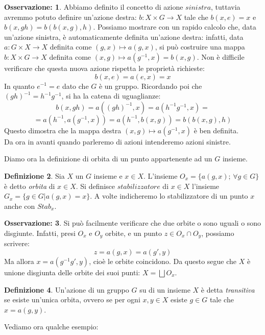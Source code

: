 \documentclass[12pt,a4paper]{report}
\theoremstyle{definition}
\newtheorem{Def}{Definizione}[chapter]
\theoremstyle{Theorem}
\theoremstyle{definition}
\theoremstyle{definition}
\theoremstyle{definition}
\newtheorem{Obs}[Def]{Osservazione:}
\begin{document}
\begin{Obs}
Abbiamo definito il concetto di azione $\textit{sinistra}$, tuttavia avremmo potuto definire un'azione destra: $b:X\times G\rightarrow X$ tale che $b(x,e)=x$ e $b(x,gh)=b(b(x,g),h)$. Possiamo mostrare con un rapido calcolo che, data un'azione sinistra, è automaticamente definita un'azione destra: infatti, data $a:G\times X\rightarrow X$ definita come $(g,x)\longmapsto a(g,x)$, si può costruire una mappa $b:X\times G\rightarrow X$ definita come $(x,g)\longmapsto a(g^{-1},x)=b(x,g)$. Non è difficile verificare che questa nuova azione rispetta le proprietà richieste:
$$b(x,e)=a(e,x)=x$$
In quanto $e^{-1}=e$ dato che $G$ è un gruppo. Ricordando poi che $(gh)^{-1}=h^{-1}g^{-1}$, si ha la catena di uguaglianze:
$$b(x,gh)=a((gh)^{-1},x)=a(h^{-1}g^{-1},x)=$$$$=a(h^{-1},a(g^{-1},x))=a(h^{-1},b(x,g))=b(b(x,g),h)$$
Questo dimostra che la mappa destra $(x,g)\longmapsto a(g^{-1},x)$ è ben definita.\\
Da ora in avanti quando parleremo di azioni intenderemo azioni sinistre.
\end{Obs}
Diamo ora la definizione di orbita di un punto appartenente ad un $G$ insieme.
\begin{Def}
	Sia $X$ un $G$ insieme e $x\in X$. L'insieme $O_x=\{a(g,x); \, \forall g\in G\}$ è detto \textit{orbita} di $x\in X$. Si definisce $\textit{stabilizzatore}$ di $x\in X$ l'insieme $G_x=\{g\in G|a(g,x)=x\}$. A volte indicheremo lo stabilizzatore di un punto $x$ anche con $Stab_x$.
\end{Def}
\begin{Obs} \label{Obs: 2.1}
	Si può facilmente verificare che due orbite o sono uguali o sono disgiunte. Infatti, presi $O_x$ e $O_y$ orbite, e un punto $z\in O_x\cap O_y$, possiamo scrivere:
	$$z=a(g,x)=a(g',y)$$
	Ma allora $x=a(g^{-1}g',y)$, cioè le orbite coincidono.
	Da questo segue che $X$ è unione disgiunta delle orbite dei suoi punti: $X=\bigsqcup O_x$.
\end{Obs}
\begin{Def}
	Un'azione di un gruppo $G$ su di un insieme $X$ è detta \textit{transitiva} se esiste un'unica orbita, ovvero se per ogni $x,y\in X$ esiste $g\in G$ tale che $x=a(g,y)$.
\end{Def}
Vediamo ora qualche esempio:
\end{document}
